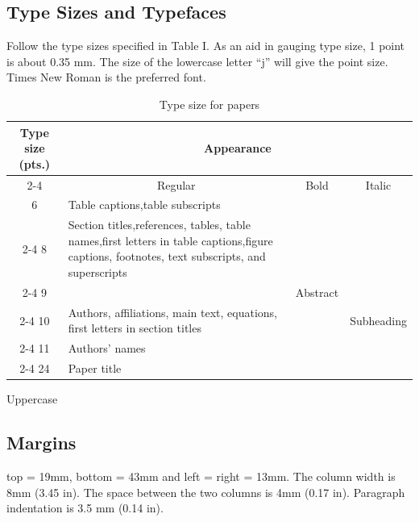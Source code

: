 \documentclass[conference,a4paper]{APSIPA2026}
\begin{document}
\subsection{Type Sizes and Typefaces}
Follow the type sizes specified in Table I.
As an aid in gauging type size, 1 point is about 0.35 mm.
The size of the lowercase letter ``j'' will give the point size.
Times New Roman is the preferred font.

\begin{table}[b]
\begin{center}
\begin{threeparttable}
\caption{Type size for papers}
\begin{tabular}{|c|p{40mm}|c|c|}
\hline
\multirow{3}{6mm}{\centering Type size (pts.)}
& \multicolumn{3}{c|}{\rule[-5pt]{0pt}{14pt} Appearance}\\
\cline{2-4}
& \multicolumn{1}{c|}{\rule[-5pt]{0pt}{16pt}Regular} & Bold & Italic\\
\hline
6 & Table captions,\tnote{a}\quad table subscripts & & \\
\cline{2-4}
8 & Section titles,\tnote{a}\quad references, tables, table
names,\tnote{a}\quad first letters in table
captions,\tnote{a}\quad figure captions, footnotes, text
subscripts, and superscripts
& & \\
\cline{2-4}
9 & & Abstract & \\
\cline{2-4}
10 & Authors,  affiliations, main text,
equations, first letters in section titles\tnote{a}\quad
& & Subheading \\
\cline{2-4}
11 & Authors' names & & \\
\cline{2-4}
24 & Paper title   & & \\
\hline
\end{tabular}
\begin{tablenotes}
\item[a] Uppercase
\end{tablenotes}
\end{threeparttable}
\end{center}
\end{table}

\subsection{Margins}
top = 19mm, bottom = 43mm and left = right = 13mm.
The column width is 8mm (3.45 in).
The space between the two columns is 4mm (0.17 in).
Paragraph indentation is 3.5 mm (0.14 in).

\end{document}
